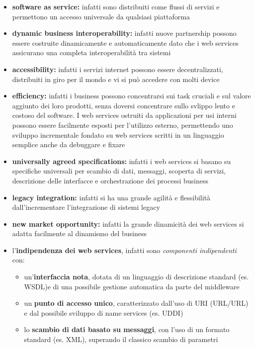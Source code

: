 \documentclass[a4paper,12pt, oneside]{book}
\begin{document}
\begin{itemize}
\item \textbf{software as service:} infatti sono distribuiti come flussi di servizi e permettono un accesso universale da qualsiasi piattaforma
\item \textbf{dynamic business interoperability:} infatti nuove partnership possono essere costruite dinamicamente e automaticamente dato che
  i web services assicurano una completa interoperabilità tra sistemi
\item \textbf{accessibility:} infatti i servizi internet possono essere decentralizzati, distribuiti in giro per il mondo e vi si può accedere con molti device
\item \textbf{efficiency:} infatti i business possono concentrarsi sui task cruciali e sul valore aggiunto dei loro prodotti, senza doversi concentrare
  sullo svlippo lento e costoso del software. I web services ostruiti da applicazioni per usi interni possono essere facilmente esposti per l'utilizzo esterno,
  permettendo uno sviluppo incrementale fondato su web services scritti in un linguaggio semplice anche da debuggare e fixare
\item \textbf{universally agreed specifications:} infatti i web services si basano su specifiche universali per scambio di dati, messaggi, scoperta di servizi,
  descrizione delle interfacce e orchestrazione dei processi business
\item \textbf{legacy integration:} infatti si ha una grande agilità e flessibilità dall'incrementare l'integrazione di sistemi legacy
\item \textbf{new market opportunity:} infatti la grande dinamicità dei web services si adatta facilmente al dinamismo del business
\item l'\textbf{indipendenza dei web services}, infatti sono \textit{componenti indipendenti} con:
  \begin{itemize}
  \item un'\textbf{interfaccia nota}, dotata di un linguaggio di descrizione standard (es. WSDL)e di una possibile gestione automatica da parte del middleware
  \item un \textbf{punto di accesso unico}, caratterizzato dall'uso di URI (URL/URL) e dal possibile sviluppo di name services (es. UDDI)
  \item lo \textbf{scambio di dati basato su messaggi}, con l'uso di un formato standard (es. XML), superando il classico scambio di parametri
  \end{itemize}
\end{itemize}
\end{document}
